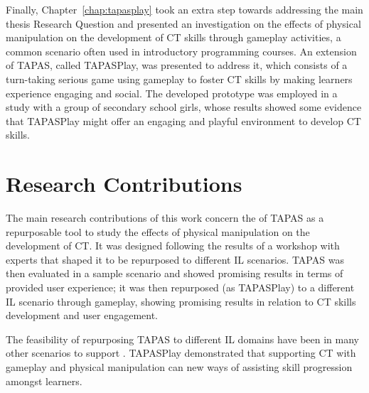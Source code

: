 Finally, Chapter~\ref{chap:tapasplay} took an extra step towards addressing the main thesis Research Question and presented an investigation on the effects of physical manipulation on the development of \ac{CT} skills through gameplay activities, a common scenario often used in introductory programming courses. An extension of \ac{TAPAS}, called TAPASPlay, was presented to address it, which consists of a turn-taking serious game using gameplay to foster \ac{CT} skills by making learners experience engaging and social. The developed prototype was employed in a study with a group of secondary school girls, whose results showed some evidence that TAPASPlay might offer an engaging and playful environment to develop \ac{CT} skills.

\section{Research Contributions}
The main research contributions of this work concern the  of \ac{TAPAS} as a repurposable tool to study the effects of physical manipulation on the development of \ac{CT}. It was designed following the results of a workshop with experts that shaped it to be repurposed to different \ac{IL} scenarios. \ac{TAPAS} was then evaluated in a sample scenario and showed promising results in terms of provided user experience; it was then repurposed (as TAPASPlay) to a different \ac{IL} scenario through gameplay, showing promising results in relation to \ac{CT} skills development and user engagement.

The feasibility of repurposing \ac{TAPAS} to different \ac{IL} domains have been  in many other scenarios to support . TAPASPlay demonstrated that supporting \ac{CT} with gameplay and physical manipulation can  new ways of assisting skill progression amongst learners.


